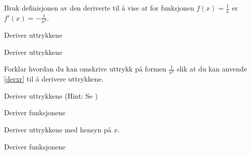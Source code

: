 





\opgt

Bruk definisjonen av den deriverte til å vise at for funksjonen $f(x)=\frac{1}{x} $ er $ f'(x)=-\frac{1}{x^2} $.

Deriver uttrykkene\os
{}

Deriver uttrykkene \os
{}

Forklar hvordan du kan omskrive uttrykk på formen $\frac{1}{x^k} $ slik at du kan anvende \eqref{derxr} til å derivere uttrykkene.

Deriver uttrykkene (Hint: Se )\os
{}

Deriver funksjonene \os
{}

Deriver uttrykkene med hensyn på $ x $. \os



\nes


Deriver funksjonene \os
{}

